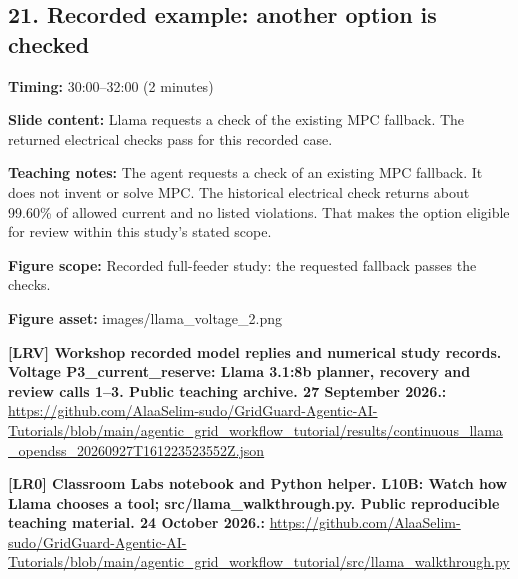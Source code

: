 \documentclass[10pt,letterpaper]{article}
\begin{document}
\subsection*{21. Recorded example: another option is checked}
\textbf{Timing:} 30:00--32:00 (2 minutes)\par
\textbf{Slide content:} Llama requests a check of the existing MPC fallback.
The returned electrical checks pass for this recorded case.\par
\textbf{Teaching notes:} The agent requests a check of an existing MPC fallback. It does not invent or solve MPC. The historical electrical check returns about 99.60\% of allowed current and no listed violations. That makes the option eligible for review within this study's stated scope.\par
\textbf{Figure scope:} Recorded full-feeder study: the requested fallback passes the checks.\par
\textbf{Figure asset:} images/llama\_voltage\_2.png\par
\textbf{[LRV] Workshop recorded model replies and numerical study records. Voltage P3\_current\_reserve: Llama 3.1:8b planner, recovery and review calls 1--3. Public teaching archive. 27 September 2026.:} \href{https://github.com/AlaaSelim-sudo/GridGuard-Agentic-AI-Tutorials/blob/main/agentic_grid_workflow_tutorial/results/continuous_llama_opendss_20260927T161223523552Z.json}{\small\ttfamily https:/\allowbreak{}/\allowbreak{}github.\allowbreak{}com/\allowbreak{}AlaaSelim-\allowbreak{}sudo/\allowbreak{}GridGuard-\allowbreak{}Agentic-\allowbreak{}AI-\allowbreak{}Tutorials/\allowbreak{}blob/\allowbreak{}main/\allowbreak{}agentic\_\allowbreak{}grid\_\allowbreak{}workflow\_\allowbreak{}tutorial/\allowbreak{}results/\allowbreak{}continuous\_\allowbreak{}llama\_\allowbreak{}opendss\_\allowbreak{}20260927T161223523552Z.\allowbreak{}json}\par
\textbf{[LR0] Classroom Labs notebook and Python helper. L10B: Watch how Llama chooses a tool; src/llama\_walkthrough.py. Public reproducible teaching material. 24 October 2026.:} \href{https://github.com/AlaaSelim-sudo/GridGuard-Agentic-AI-Tutorials/blob/main/agentic_grid_workflow_tutorial/src/llama_walkthrough.py}{\small\ttfamily https:/\allowbreak{}/\allowbreak{}github.\allowbreak{}com/\allowbreak{}AlaaSelim-\allowbreak{}sudo/\allowbreak{}GridGuard-\allowbreak{}Agentic-\allowbreak{}AI-\allowbreak{}Tutorials/\allowbreak{}blob/\allowbreak{}main/\allowbreak{}agentic\_\allowbreak{}grid\_\allowbreak{}workflow\_\allowbreak{}tutorial/\allowbreak{}src/\allowbreak{}llama\_\allowbreak{}walkthrough.\allowbreak{}py}\par
\par\medskip
\end{document}
